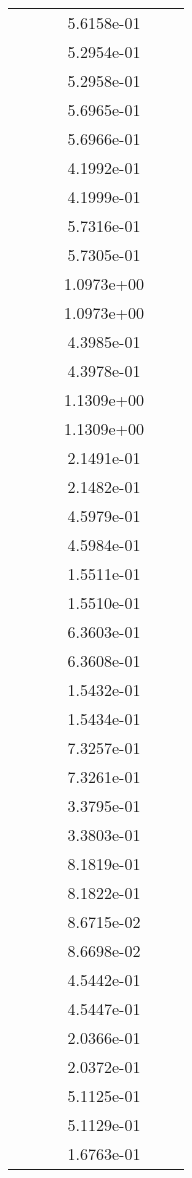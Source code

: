 \begin{xltabular}{\textwidth}{r|rS[table-format=1.3e+2]S[table-format=1.4e+2]S[table-format=1.4e+2]S[table-format=-1.5]}
&  &  & 5.6158e-01 & & \\
&  &  & 5.2954e-01 & & \\
&  &  & 5.2958e-01 & & \\
&  &  & 5.6965e-01 & & \\
&  &  & 5.6966e-01 & & \\
&  &  & 4.1992e-01 & & \\
&  &  & 4.1999e-01 & & \\
&  &  & 5.7316e-01 & & \\
&  &  & 5.7305e-01 & & \\
&  &  & 1.0973e+00 & & \\
&  &  & 1.0973e+00 & & \\
&  &  & 4.3985e-01 & & \\
&  &  & 4.3978e-01 & & \\
&  &  & 1.1309e+00 & & \\
&  &  & 1.1309e+00 & & \\
&  &  & 2.1491e-01 & & \\
&  &  & 2.1482e-01 & & \\
&  &  & 4.5979e-01 & & \\
&  &  & 4.5984e-01 & & \\
&  &  & 1.5511e-01 & & \\
&  &  & 1.5510e-01 & & \\
&  &  & 6.3603e-01 & & \\
&  &  & 6.3608e-01 & & \\
&  &  & 1.5432e-01 & & \\
&  &  & 1.5434e-01 & & \\
&  &  & 7.3257e-01 & & \\
&  &  & 7.3261e-01 & & \\
&  &  & 3.3795e-01 & & \\
&  &  & 3.3803e-01 & & \\
&  &  & 8.1819e-01 & & \\
&  &  & 8.1822e-01 & & \\
&  &  & 8.6715e-02 & & \\
&  &  & 8.6698e-02 & & \\
&  &  & 4.5442e-01 & & \\
&  &  & 4.5447e-01 & & \\
&  &  & 2.0366e-01 & & \\
&  &  & 2.0372e-01 & & \\
&  &  & 5.1125e-01 & & \\
&  &  & 5.1129e-01 & & \\
&  &  & 1.6763e-01 & & \\

\end{xltabular}
